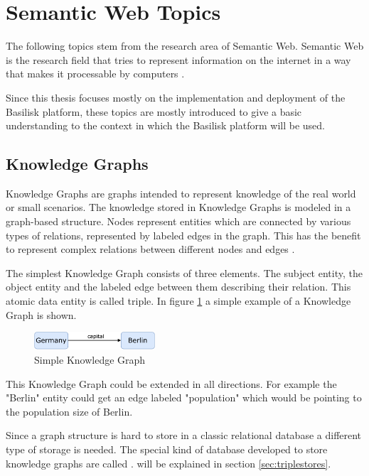 \section{Semantic Web Topics}
\label{sec:sw_topics}
The following topics stem from the research area of Semantic Web.
Semantic Web is the research field that tries to represent information on the internet in a way that makes it processable by computers \cite{hitzlerSemanticWebGrundlagen2008}.

Since this thesis focuses mostly on the implementation and deployment of the Basilisk platform, these topics are mostly introduced to give a basic understanding to the context in which the Basilisk platform will be used.

\subsection{Knowledge Graphs} 
\label{sec:knowledge_graphs}
Knowledge Graphs are graphs intended to represent knowledge of the real world or small scenarios.
The knowledge stored in Knowledge Graphs is modeled in a graph-based structure. 
Nodes represent entities which are connected by various types of relations, represented by labeled edges in the graph.
This has the benefit to represent complex relations between different nodes and edges \cite{hoganKnowledgeGraphs2021}.

The simplest Knowledge Graph consists of three elements.
The subject entity, the object entity and the labeled edge between them describing their relation.
This atomic data entity is called triple.
In figure \ref{fig:example-knowledge-graph} a simple example of a Knowledge Graph is shown.

\begin{figure}[tbph]
	\centering
	\includegraphics[width=0.4\textwidth]{figures/knowledge-graph-diagram}
	\caption{Simple Knowledge Graph}
	\label{fig:example-knowledge-graph}
\end{figure}

This Knowledge Graph could be extended in all directions.
For example the "Berlin" entity could get an edge labeled "population" which would be pointing to the population size of Berlin.

Since a graph structure is hard to store in a classic relational database a different type of storage is needed.
The special kind of database developed to store knowledge graphs are called \tsp{}.
\tsp{} will be explained in section \ref{sec:triplestores}.



